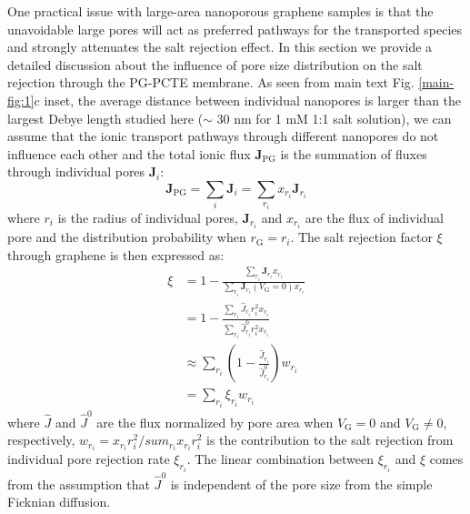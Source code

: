 \documentclass[manuscript=suppinfo,email=true, hyperref=true, keywords=false]{achemso}
\newcommand{\Fig}{Fig.}
\begin{document}
One practical issue with large-area nanoporous graphene samples is
that the unavoidable large pores will act as preferred pathways for
the transported species and strongly attenuates the salt rejection
effect. In this section we provide a detailed discussion about the
influence of pore size distribution on the salt rejection through the
PG-PCTE membrane. As seen from main text \Fig{} \ref{main-fig:1}c
inset, the average distance between individual nanopores is larger
than the largest Debye length studied here ($\sim{}$ 30 nm for 1 mM 1:1
salt solution), we can assume that the ionic transport pathways
through different nanopores do not influence each other and the total
ionic flux $\boldsymbol{J}_{\mathrm{PG}}$ is the summation of fluxes
through individual pores $\boldsymbol{J}_{i}$:
\begin{equation}
\label{eq:J-total}
\boldsymbol{J}_{\mathrm{PG}} = \sum_{i} \boldsymbol{J}_{i} = \sum_{r_{i}} x_{r_{i}} \boldsymbol{J}_{r_{i}}
\end{equation}
where $r_{i}$ is the radius of individual pores,
$\boldsymbol{J}_{r_{i}}$ and $x_{r_{i}}$ are the flux of individual
pore and the distribution probability when
$r_{\mathrm{G}} = r_{i}$. The salt rejection factor
$\xi$ through graphene is then expressed as:
\begin{equation}
  \label{eq:xi-pore}
  \begin{aligned}
    \xi &= 1 - \frac{\sum_{r_{i}} \boldsymbol{J}_{r_{i}} x_{r_{i}}}
           {\sum_{r_{i}} \boldsymbol{J}_{r_{i}}(V_{\mathrm{G}} = 0) x_{r_{i}}} \\
           &= 1 - \frac{\sum_{r_{i}} \hat{J}_{r_{i}} r_{i}^{2} x_{r_{i}}}
           {\sum_{r_{i}} \hat{J}_{r_{i}}^{0} r_{i}^{2} x_{r_{i}}} \\
           &\approx \sum_{r_{i}} \left(1 -  \frac{\hat{J}_{r_{i}}}{\hat{J}_{r_{i}}^{0}}\right) w_{r_{i}} \\
           &= \sum_{r_{i}} \xi_{r_{i}} w_{r_{i}}
  \end{aligned}
\end{equation}
where $\hat{J}$ and $\hat{J}^{0}$ are the flux normalized by pore area
when $V_{\mathrm{G}} = 0$ and $V_{\mathrm{G}} \neq 0$, respectively,
$w_{r_{i}} = x_{r_{i}} r_{i}^{2} / sum_{r_{i}} x_{r_{i}} r_{i}^{2}$ is
the contribution to the salt rejection from individual pore rejection
rate $\xi_{r_{i}}$. The linear combination between $\xi_{r_{i}}$ and
$\xi$ comes from the assumption that $\hat{J}^{0}$ is independent of
the pore size from the simple Ficknian diffusion.
\end{document}
